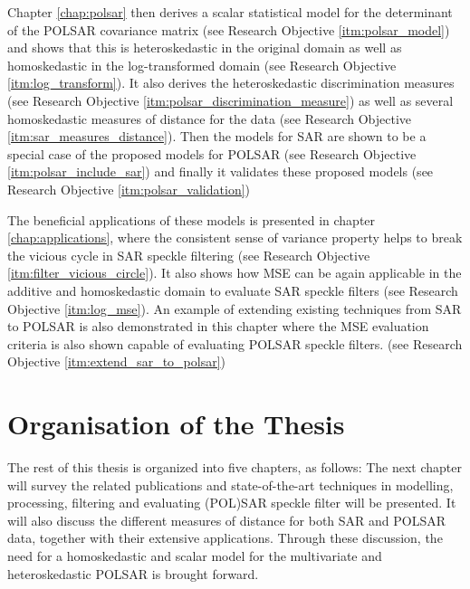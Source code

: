  Chapter
                \ref{chap:polsar} then derives a scalar statistical model for the
                determinant of the POLSAR covariance matrix (see Research Objective \ref{itm:polsar_model}) and
                shows that this is heteroskedastic in the original
                domain as well as homoskedastic in the log-transformed
                domain (see Research Objective \ref{itm:log_transform}).
It
                also derives the heteroskedastic discrimination measures
                (see Research Objective \ref{itm:polsar_discrimination_measure}) as well as several homoskedastic measures of
                distance for the data (see Research Objective \ref{itm:sar_measures_distance}).
Then
                the models for SAR are shown to be a special case of
                the proposed models for POLSAR (see Research Objective \ref{itm:polsar_include_sar}) and finally it
                validates these proposed models (see Research Objective \ref{itm:polsar_validation})

 The
                beneficial applications of these models is presented in
                chapter \ref{chap:applications}, where the consistent sense of variance
                property helps to break the vicious cycle in SAR
                speckle filtering (see Research Objective \ref{itm:filter_vicious_circle}).
It
                also shows how MSE can be again applicable in the
                additive and homoskedastic domain to evaluate SAR
                speckle filters (see Research Objective \ref{itm:log_mse}).
An
                example of extending existing techniques from SAR to
                POLSAR is also demonstrated in this chapter where the
                MSE evaluation criteria is also shown capable of
                evaluating POLSAR speckle filters. (see Research Objective \ref{itm:extend_sar_to_polsar})


	\section{Organisation of the Thesis}
The rest of this thesis is organized into five chapters, as follows:
The next chapter will survey the related publications
  and state-of-the-art techniques in modelling, processing, filtering and evaluating (POL)SAR speckle filter will be presented.
It will also discuss the different measures of distance for both SAR and POLSAR data, together with their extensive applications. 
Through these discussion, the need for a homoskedastic and scalar model for the multivariate and heteroskedastic POLSAR is brought forward.

